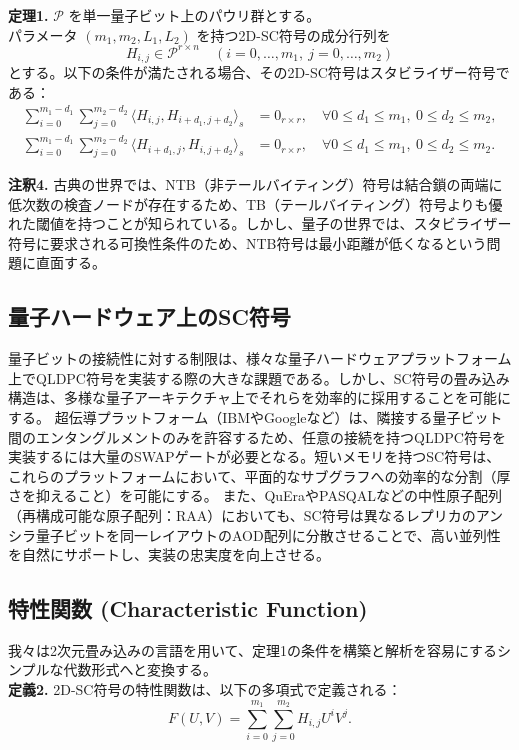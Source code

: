 \documentclass[a4paper,11pt]{article}
\begin{document}
\textbf{定理1.} $\mathcal{P}$ を単一量子ビット上のパウリ群とする。\\
パラメータ $(m_1, m_2, L_1, L_2)$ を持つ2D-SC符号の成分行列を
\[
  H_{i,j} \in \mathcal{P}^{r \times n} \quad (i=0,\dots,m_1, \ j=0,\dots,m_2)
\]
とする。以下の条件が満たされる場合、その2D-SC符号はスタビライザー符号である：
\begin{align}
\sum_{i=0}^{m_1-d_1} \sum_{j=0}^{m_2-d_2} \langle H_{i,j}, H_{i+d_1, j+d_2} \rangle_s &= 0_{r \times r}, \quad \forall 0 \le d_1 \le m_1, \ 0 \le d_2 \le m_2, \label{eq:thm1_cond1} \\
\sum_{i=0}^{m_1-d_1} \sum_{j=0}^{m_2-d_2} \langle H_{i+d_1, j}, H_{i, j+d_2} \rangle_s &= 0_{r \times r}, \quad \forall 0 \le d_1 \le m_1, \ 0 \le d_2 \le m_2. \label{eq:thm1_cond2}
\end{align}

\noindent \textbf{注釈4.} 古典の世界では、NTB（非テールバイティング）符号は結合鎖の両端に低次数の検査ノードが存在するため、TB（テールバイティング）符号よりも優れた閾値を持つことが知られている。しかし、量子の世界では、スタビライザー符号に要求される可換性条件のため、NTB符号は最小距離が低くなるという問題に直面する。

\subsection{量子ハードウェア上のSC符号}
量子ビットの接続性に対する制限は、様々な量子ハードウェアプラットフォーム上でQLDPC符号を実装する際の大きな課題である。しかし、SC符号の畳み込み構造は、多様な量子アーキテクチャ上でそれらを効率的に採用することを可能にする。
超伝導プラットフォーム（IBMやGoogleなど）は、隣接する量子ビット間のエンタングルメントのみを許容するため、任意の接続を持つQLDPC符号を実装するには大量のSWAPゲートが必要となる。短いメモリを持つSC符号は、これらのプラットフォームにおいて、平面的なサブグラフへの効率的な分割（厚さを抑えること）を可能にする。
また、QuEraやPASQALなどの中性原子配列（再構成可能な原子配列：RAA）においても、SC符号は異なるレプリカのアンシラ量子ビットを同一レイアウトのAOD配列に分散させることで、高い並列性を自然にサポートし、実装の忠実度を向上させる。

\subsection{特性関数 (Characteristic Function)}
我々は2次元畳み込みの言語を用いて、定理1の条件を構築と解析を容易にするシンプルな代数形式へと変換する。\\
\textbf{定義2.} 2D-SC符号の特性関数は、以下の多項式で定義される：
\begin{equation}
F(U,V) = \sum_{i=0}^{m_1} \sum_{j=0}^{m_2} H_{i,j} U^i V^j. \label{eq:characteristic_func}
\end{equation}
\end{document}
